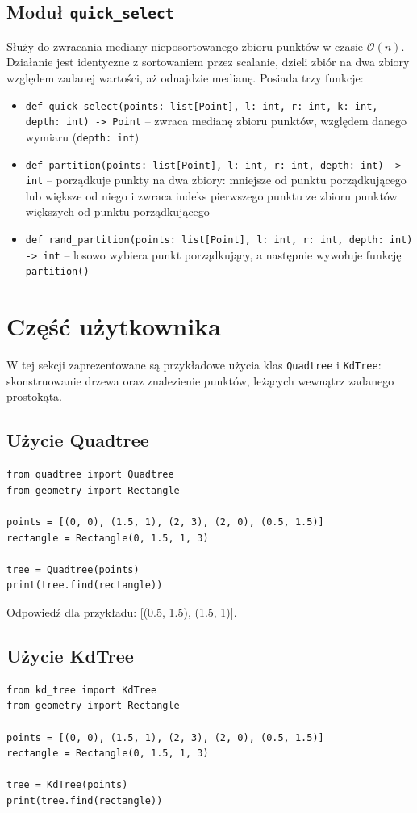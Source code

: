 \documentclass[12pt]{scrartcl}
\newcommand{\sO}{\mathcal O}
\begin{document}
\subsection{Moduł \texttt{quick\_select}}
Służy do zwracania mediany nieposortowanego zbioru punktów w czasie $\sO(n)$. Działanie jest identyczne z sortowaniem przez scalanie, dzieli zbiór na dwa zbiory względem zadanej wartości, aż odnajdzie medianę. Posiada trzy funkcje:
\begin{itemize}
    \item \texttt{def quick\_select(points: list[Point], l: int, r: int, k: int, depth: int) -> Point} -- zwraca medianę zbioru punktów, względem danego wymiaru (\texttt{depth: int})
    \item \texttt{def partition(points: list[Point], l: int, r: int, depth: int) -> int} -- porządkuje punkty na dwa zbiory: mniejsze od punktu porządkującego lub większe od niego i zwraca indeks pierwszego punktu ze zbioru punktów większych od punktu porządkującego
    \item \texttt{def rand\_partition(points: list[Point], l: int, r: int, depth: int) -> int} -- losowo wybiera punkt porządkujący, a następnie wywołuje funkcję \texttt{partition()}
\end{itemize}

\section{Część użytkownika}
W tej sekcji zaprezentowane są przykładowe użycia klas \texttt{Quadtree} i \texttt{KdTree}: skonstruowanie drzewa oraz znalezienie punktów, leżących wewnątrz zadanego prostokąta.

\subsection{Użycie Quadtree}
\begin{verbatim}
from quadtree import Quadtree
from geometry import Rectangle

points = [(0, 0), (1.5, 1), (2, 3), (2, 0), (0.5, 1.5)]
rectangle = Rectangle(0, 1.5, 1, 3)

tree = Quadtree(points)
print(tree.find(rectangle))
\end{verbatim}

Odpowiedź dla przykładu: [(0.5, 1.5), (1.5, 1)].

\subsection{Użycie KdTree}
\begin{verbatim}
from kd_tree import KdTree
from geometry import Rectangle

points = [(0, 0), (1.5, 1), (2, 3), (2, 0), (0.5, 1.5)]
rectangle = Rectangle(0, 1.5, 1, 3)

tree = KdTree(points)
print(tree.find(rectangle))
\end{verbatim}
\end{document}
